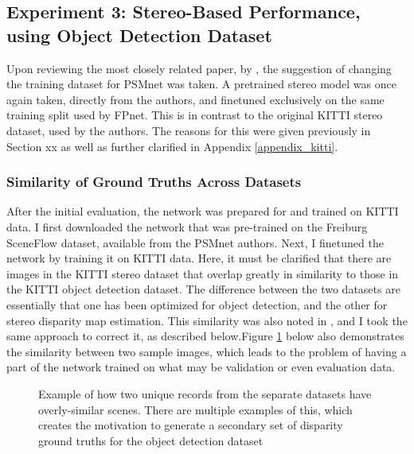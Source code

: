 \subsection{Experiment 3: Stereo-Based Performance, using Object Detection Dataset}
Upon reviewing the most closely related paper, by \cite{wang_pseudo-lidar_2019}, the suggestion of changing the training dataset for PSMnet was taken. A pretrained stereo model was once again taken, directly from the authors, and finetuned exclusively on the same training split used by FPnet. This is in contrast to the original KITTI stereo dataset, used by the authors. The reasons for this were given previously in Section xx as well as further clarified in Appendix \ref{appendix_kitti}.

\subsubsection{Similarity of Ground Truths Across Datasets}
After the initial evaluation, the network was prepared for and trained on KITTI data. I first downloaded the network that was pre-trained on the Freiburg SceneFlow dataset, available from the PSMnet authors. Next, I finetuned the network by training it on KITTI data. Here, it must be clarified that there are images in the KITTI stereo dataset that overlap greatly in similarity to those in the KITTI object detection dataset. The difference between the two datasets are essentially that one has been optimized for object detection, and the other for stereo disparity map estimation. This similarity was also noted in \cite{wang_pseudo-lidar_2019}, and I took the same approach to correct it, as described below.Figure \ref{similarity_stereo_objdet} below also demonstrates the similarity between two sample images, which leads to the problem of having a part of the network trained on what may be validation or even evaluation data.

\begin{figure}[ht]
	\centering
	\caption{Example of how two unique records from the separate datasets have overly-similar scenes. There are multiple examples of this, which creates the motivation to generate a secondary set of disparity ground truths for the object detection dataset}
	\label{similarity_stereo_objdet}
\end{figure}

